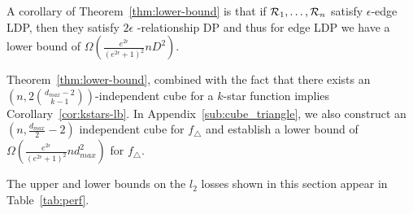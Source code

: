 
A corollary of Theorem~\ref{thm:lower-bound} is that if $\mathcal{R}_1, \ldots,
\mathcal{R}_n$ satisfy $\epsilon$-edge LDP, then they satisfy $2\epsilon$
-relationship DP and thus for edge LDP we have a lower bound of
$\Omega\left(\frac{e^{2\epsilon}}{(e^{2\epsilon}+1)^2}nD^2\right)$.

Theorem~\ref{thm:lower-bound}, combined with the fact that there exists an
$(n,2\binom{d_{max}-2}{k-1})$-independent cube for 
a $k$-star function 
implies Corollary~\ref{cor:kstars-lb}. 
In Appendix~\ref{sub:cube_triangle}, we also construct an $(n, \frac{d_{max}}{2}-2)$
independent cube 
for $f_\triangle$ and establish a lower bound of 
$\Omega(\frac{e^{2\epsilon}}{(e^{2\epsilon}+1)^2} nd_{max}^2)$ for
$f_\triangle$. 

The upper and lower bounds on the $l_2$ losses 
shown in
this section appear in Table~\ref{tab:perf}.
